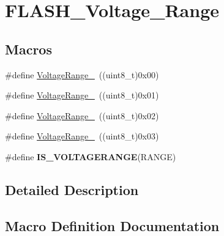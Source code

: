 \hypertarget{group___f_l_a_s_h___voltage___range}{}\section{F\+L\+A\+S\+H\+\_\+\+Voltage\+\_\+\+Range}
\label{group___f_l_a_s_h___voltage___range}
\subsection*{Macros}
\begin{DoxyCompactItemize}
\item 
\#define \hyperlink{group___f_l_a_s_h___voltage___range_ga0ed013741f9d88425fe97da49f4980c1}{Voltage\+Range\+\_}~((uint8\+\_\+t)0x00)
\item 
\#define \hyperlink{group___f_l_a_s_h___voltage___range_ga4c080832b4c8c992acb645f2c39561e0}{Voltage\+Range\+\_}~((uint8\+\_\+t)0x01)
\item 
\#define \hyperlink{group___f_l_a_s_h___voltage___range_gadd249fb08c69b11cea3a6b7c22865b99}{Voltage\+Range\+\_}~((uint8\+\_\+t)0x02)
\item 
\#define \hyperlink{group___f_l_a_s_h___voltage___range_ga3197950f6bfefc8b9a784db5439a0498}{Voltage\+Range\+\_}~((uint8\+\_\+t)0x03)
\item 
\#define {\bfseries I\+S\+\_\+\+V\+O\+L\+T\+A\+G\+E\+R\+A\+N\+G\+E}(R\+A\+N\+G\+E)
\end{DoxyCompactItemize}


\subsection{Detailed Description}


\subsection{Macro Definition Documentation}
\hypertarget{group___f_l_a_s_h___voltage___range_gaa9682aea9d9ceebca83c48e53f9f6028}{}
